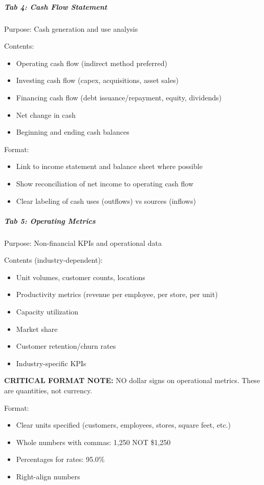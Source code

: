 \documentclass[11pt]{article}
\begin{document}
\subparagraph{Tab 4: Cash Flow Statement}\mbox{}\par
Purpose: Cash generation and use analysis


Contents:

\begin{itemize}[leftmargin=*,itemsep=2pt,topsep=2pt]
\item {} Operating cash flow (indirect method preferred)
\item {} Investing cash flow (capex, acquisitions, asset sales)
\item {} Financing cash flow (debt issuance/repayment, equity, dividends)
\item {} Net change in cash
\item {} Beginning and ending cash balances
\end{itemize}

Format:

\begin{itemize}[leftmargin=*,itemsep=2pt,topsep=2pt]
\item {} Link to income statement and balance sheet where possible
\item {} Show reconciliation of net income to operating cash flow
\item {} Clear labeling of cash uses (outflows) vs sources (inflows)
\end{itemize}

\subparagraph{Tab 5: Operating Metrics}\mbox{}\par
Purpose: Non-financial KPIs and operational data


Contents (industry-dependent):

\begin{itemize}[leftmargin=*,itemsep=2pt,topsep=2pt]
\item {} Unit volumes, customer counts, locations
\item {} Productivity metrics (revenue per employee, per store, per unit)
\item {} Capacity utilization
\item {} Market share
\item {} Customer retention/churn rates
\item {} Industry-specific KPIs
\end{itemize}

\textbf{CRITICAL FORMAT NOTE:} NO dollar signs on operational metrics. These are quantities, not currency.


Format:

\begin{itemize}[leftmargin=*,itemsep=2pt,topsep=2pt]
\item {} Clear units specified (customers, employees, stores, square feet, etc.)
\item {} Whole numbers with commas: 1,250 NOT \$1,250
\item {} Percentages for rates: 95.0\%
\item {} Right-align numbers
\end{itemize}
\end{document}
